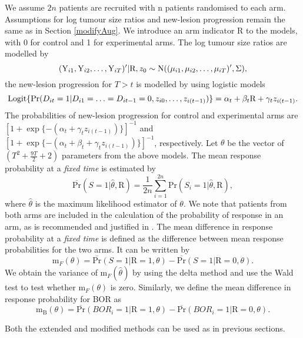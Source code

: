 \documentclass[10pt,A4]{article}
\begin{document}
We assume $2n$ patients are recruited with n patients randomised to each arm. Assumptions for log tumour size ratios and new-lesion progression remain the same as in Section \ref{modifyAug}. We introduce an arm indicator R to the models, with 0 for control and 1 for experimental arms. The log tumour size ratios are modelled by
\[
(\text{Y}_{i1}, \text{Y}_{i2},\ldots, \text{Y}_{iT})'|\text{R},z_0 \sim \hbox{N}((\mu_{i1}, \mu_{i2}, \ldots, \mu_{iT})',\Sigma),
\]
the new-lesion progression for $T>t$ is modelled by using logistic models
\[
\hbox{Logit}\{\text{Pr}(D_{it}=1|D_{i1}=\ldots=D_{i{t-1}}=0, z_{i0},\ldots,z_{i(t-1)})\}=\alpha_t+\beta_t\text{R}+\gamma_tz_{i(t-1)}.
\]
The probabilities of new-lesion progression for control and experimental arms are $[1+\exp \{-(\alpha_t+\gamma_tz_{i(t-1)})\}]^{-1}$ and $[1+\exp \{-(\alpha_t+\beta_t+\gamma_tz_{i(t-1)})\}]^{-1}$, respectively. Let $\theta$ be the vector of $(T^2+ \frac{9T }{2}+2)$ parameters from the above models.
The mean response probability at a \textit{fixed time} is estimated by
\[
\overline{\text{Pr}}(S=1|\hat{\theta},\text{R})=\frac{1}{2n}\sum\limits_{i=1}^{2n}\text{Pr}(S_i=1|\hat{\theta},\text{R}),
\]
where $\hat{\theta}$ is the maximum likelihood estimator of $\theta$. We note that patients from both arms are included in the calculation of the probability of response in an arm, as is recommended and justified in \cite{Wason2013}. The mean difference in response probability at a \textit{fixed time} is defined as the difference between mean response probabilities for the two arms. It can be written by
\[
\text{m}_F(\theta)=\overline{\text{Pr}}(S=1|\text{R}=1,\theta)-\overline{\text{Pr}}(S=1|\text{R}=0,\theta).
\]
We obtain the variance of $\text{m}_F(\hat{\theta})$ by using the delta method and use the Wald test to test whether $\text{m}_F(\theta)$ is zero. Similarly, we define the mean difference in response probability for BOR as
\[
\text{m}_\text{B}(\theta)=\overline{\text{Pr}}(BOR_i=1|\text{R}=1,\theta)-\overline{\text{Pr}}(BOR_i=1|\text{R}=0,\theta).
\]

Both the extended and modified methods can be used as in previous sections.
\end{document}
